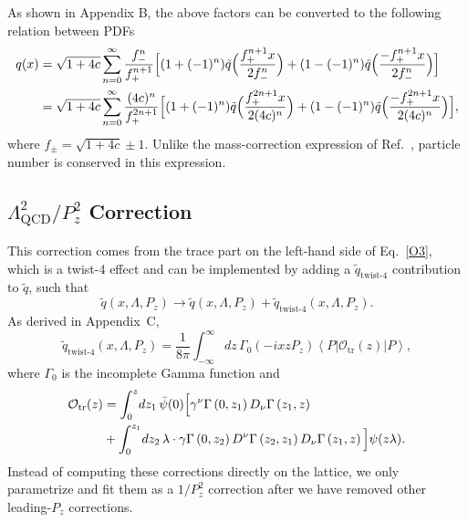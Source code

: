 As shown in Appendix B, the above factors can be converted to the following relation between PDFs
\begin{align}
q(x)&=\sqrt{1+4c}\sum_{n=0}^\infty \frac{f_-^n}{f_+^{n+1}}\Big[(1+(-1)^n)\tilde q\Big(\frac{f_+^{n+1}x}{2f_-^n}\Big)+(1-(-1)^n)\tilde q\Big(\frac{-f_+^{n+1}x}{2f_-^n}\Big)\Big]\nonumber\\
&=\sqrt{1+4c}\sum_{n=0}^\infty \frac{(4c)^n}{f_+^{2n+1}}\Big[(1+(-1)^n)\tilde q\Big(\frac{f_+^{2n+1}x}{2(4c)^n}\Big)+(1-(-1)^n)\tilde q\Big(\frac{-f_+^{2n+1}x}{2(4c)^n}\Big)\Big],
\end{align}
where $f_{\pm}=\sqrt{1+4c}\pm 1$. Unlike the mass-correction expression of Ref.~\cite{Alexandrou:2015rja}, particle number is conserved in this expression.

\subsection{$\Lambda_\text{QCD}^2/P_z^2$ Correction}

This correction comes from the trace part on the left-hand side of Eq.~\ref{O3},
which is a twist-4 effect and can be implemented by adding a
$\tilde{q}_\text{twist-4}$ contribution to $\tilde{q}$, such that
%
\begin{equation}
\tilde{q}(x,\Lambda,P_z) \rightarrow
  \tilde{q}(x,\Lambda,P_z) + \tilde{q}_\text{twist-4}(x,\Lambda,P_z).
\end{equation}
%
As derived in Appendix~C,
%
\begin{equation}
\tilde{q}_\text{twist-4}(x,\Lambda,P_z) =
  \frac{1}{8\pi}\int_{-\infty}^\infty\!dz\,\Gamma_0 \left(-ixzP_z\right)
  \left\langle P\left\vert \mathcal{O}_\text{tr}(z)\right\vert P\right\rangle,
  \label{t4-1}
\end{equation}
%
where $\Gamma_0$ is the incomplete Gamma function and
%
\begin{align}
\mathcal{O}_\text{tr}(z) &=
  \int_0^z\!dz_1\,\bar{\psi}(0) \Big[ \gamma^\nu \Gamma\left(0,z_1\right)
    D_\nu\Gamma \left(z_1,z\right) \notag \\
&{} + \int_0^{z_1}\!dz_2\, \lambda \cdot \gamma
  \Gamma\left(0,z_2 \right) D^\nu \Gamma \left(z_2,z_1\right)
  D_\nu \Gamma\left(z_1,z\right) \Big] \psi (z\lambda).  \label{t4-2}
\end{align}
%
Instead of computing these corrections directly on the lattice, we only
parametrize and fit them as a $1/P_z^2$ correction after we have
removed other leading-$P_z$ corrections.

